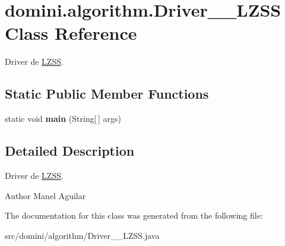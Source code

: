 \hypertarget{classdomini_1_1algorithm_1_1Driver____LZSS}{}\section{domini.\+algorithm.\+Driver\+\_\+\+\_\+\+L\+Z\+SS Class Reference}
\label{classdomini_1_1algorithm_1_1Driver____LZSS}


Driver de \hyperlink{classdomini_1_1algorithm_1_1LZSS}{L\+Z\+SS}.  


\subsection*{Static Public Member Functions}
\begin{DoxyCompactItemize}
\item 
\mbox{\label{classdomini_1_1algorithm_1_1Driver____LZSS_ac1b8e15e184e7372a5ad2a76ac3b5d8c}} 
static void {\bfseries main} (String\mbox{[}$\,$\mbox{]} args)
\end{DoxyCompactItemize}


\subsection{Detailed Description}
Driver de \hyperlink{classdomini_1_1algorithm_1_1LZSS}{L\+Z\+SS}. 

\begin{DoxyAuthor}{Author}
Manel Aguilar 
\end{DoxyAuthor}


The documentation for this class was generated from the following file\+:\begin{DoxyCompactItemize}
\item 
src/domini/algorithm/Driver\+\_\+\+\_\+\+L\+Z\+S\+S.\+java\end{DoxyCompactItemize}
